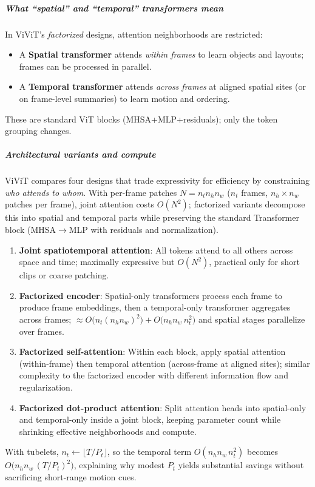 \subparagraph{What ``spatial'' and ``temporal'' transformers mean}
In ViViT’s \emph{factorized} designs, attention neighborhoods are restricted:
\begin{itemize}
    \item A \textbf{Spatial transformer} attends \emph{within frames} to learn objects and layouts; frames can be processed in parallel.
    \item A \textbf{Temporal transformer} attends \emph{across frames} at aligned spatial sites (or on frame-level summaries) to learn motion and ordering.
\end{itemize}
These are standard ViT blocks (MHSA+MLP+residuals); only the token grouping changes.

\subparagraph{Architectural variants and compute}
ViViT compares four designs that trade expressivity for efficiency by constraining \emph{who attends to whom}. With per-frame patches $N=n_t n_h n_w$ ($n_t$ frames, $n_h{\times}n_w$ patches per frame), joint attention costs $O(N^2)$; factorized variants decompose this into spatial and temporal parts while preserving the standard Transformer block (MHSA$\rightarrow$MLP with residuals and normalization).
\begin{enumerate}
    \item \textbf{Joint spatiotemporal attention}: All tokens attend to all others across space and time; maximally expressive but $O(N^2)$, practical only for short clips or coarse patching.
    \item \textbf{Factorized encoder}: Spatial-only transformers process each frame to produce frame embeddings, then a temporal-only transformer aggregates across frames; $\approx O\!\big(n_t(n_h n_w)^2\big) + O\!\big(n_h n_w\,n_t^2\big)$ and spatial stages parallelize over frames.
    \item \textbf{Factorized self-attention}: Within each block, apply spatial attention (within-frame) then temporal attention (across-frame at aligned sites); similar complexity to the factorized encoder with different information flow and regularization.
    \item \textbf{Factorized dot-product attention}: Split attention heads into spatial-only and temporal-only inside a joint block, keeping parameter count while shrinking effective neighborhoods and compute.
\end{enumerate}
With tubelets, $n_t \leftarrow \lfloor T/P_t \rfloor$, so the temporal term $O(n_h n_w\,n_t^2)$ becomes $O\!\big(n_h n_w\,(T/P_t)^2\big)$, explaining why modest $P_t$ yields substantial savings without sacrificing short-range motion cues.

